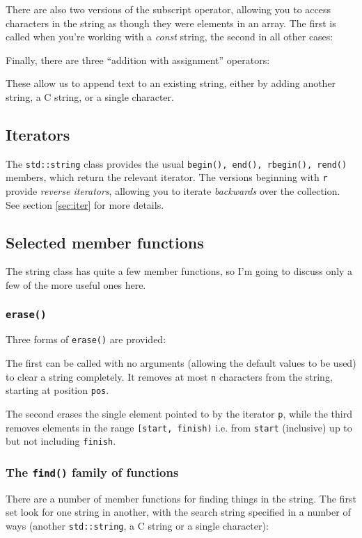 \documentclass[a4paper]{scrartcl}
\begin{document}
There are also two versions of the subscript operator, allowing you to access characters in the string as though they were elements in an array. The first is called when you're working with a \emph{const} string, the second in all other cases:


Finally, there are three ``addition with assignment'' operators:


These allow us to append text to an existing string, either by adding another string, a C string, or a single character.

\subsection{Iterators}
The \texttt{std::string} class provides the usual \texttt{begin(), end(), rbegin(), rend()} members, which return the relevant iterator. The versions beginning with \texttt{r} provide \emph{reverse iterators}, allowing you to iterate \emph{backwards} over the collection. See section \ref{sec:iter} for more details.

\subsection{Selected member functions}
The string class has quite a few member functions, so I'm going to discuss only a few of the more useful ones here.

\subsubsection{\texttt{erase()}}
Three forms of \texttt{erase()} are provided:


The first can be called with no arguments (allowing the default values to be used) to clear a string completely. It removes at most \texttt{n} characters from the string, starting at position \texttt{pos}.

The second erases the single element pointed to by the iterator \texttt{p}, while the third removes elements in the range \texttt{[start, finish)} i.e. from \texttt{start} (inclusive) up to but not including \texttt{finish}.

\subsubsection{The \texttt{find()} family of functions}
There are a number of member functions for finding things in the string. The first set look for one string in another, with the search string specified in a number of ways (another \texttt{std::string}, a C string or a single character):

\end{document}
